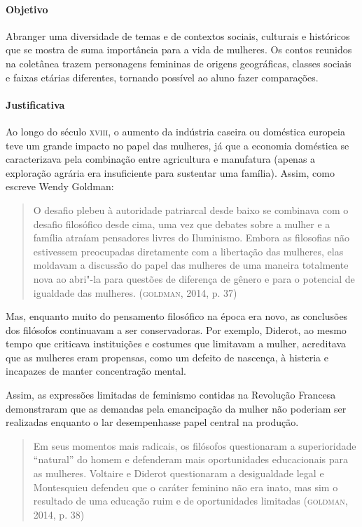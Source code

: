 \documentclass[11pt]{extarticle}
\begin{document}
\paragraph{Objetivo}
Abranger uma diversidade de temas e de contextos sociais, culturais e
históricos que se mostra de suma importância para a vida de mulheres. Os
contos reunidos na coletânea trazem personagens femininas de origens
geográficas, classes sociais e faixas etárias diferentes, tornando
possível ao aluno fazer comparações.

\paragraph{Justificativa}
Ao longo do século \textsc{xviii}, o aumento da indústria caseira ou doméstica
europeia teve um grande impacto no papel das mulheres, já que a economia
doméstica se caracterizava pela combinação entre agricultura e
manufatura (apenas a exploração agrária era insuficiente para sustentar
uma família). Assim, como escreve Wendy Goldman:

\begin{quote}
O desafio plebeu à autoridade patriarcal desde baixo se combinava com o
desafio filosófico desde cima, uma vez que debates sobre a mulher e a
família atraíam pensadores livres do Iluminismo. Embora as filosofias
não estivessem preocupadas diretamente com a libertação das mulheres,
elas moldavam a discussão do papel das mulheres de uma maneira
totalmente nova ao abri"-la para questões de diferença de gênero e para o
potencial de igualdade das mulheres. (\textsc{goldman}, 2014, p. 37)
\end{quote}

Mas, enquanto muito do pensamento filosófico na época era novo, as
conclusões dos filósofos continuavam a ser conservadoras. Por exemplo,
Diderot, ao mesmo tempo que criticava instituições e costumes que
limitavam a mulher, acreditava que as mulheres eram propensas, como um
defeito de nascença, à histeria e incapazes de manter concentração
mental.

Assim, as expressões limitadas de feminismo contidas na Revolução
Francesa demonstraram que as demandas pela emancipação da mulher não
poderiam ser realizadas enquanto o lar desempenhasse papel central na
produção.

\begin{quote}
Em seus momentos mais radicais, os filósofos questionaram a
superioridade ``natural'' do homem e defenderam mais oportunidades
educacionais para as mulheres. Voltaire e Diderot questionaram a
desigualdade legal e Montesquieu defendeu que o caráter feminino não era
inato, mas sim o resultado de uma educação ruim e de oportunidades
limitadas (\textsc{goldman}, 2014, p. 38)
\end{quote}
\end{document}
